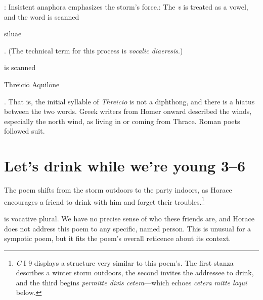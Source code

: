 
: Insistent anaphora emphasizes the storm's force.\indent{}: The \textit{v} is treated as a vowel, and the word is scanned \begin{metrica}s\-il\-u\=ae\end{metrica}.  (The technical term for this process is \textit{vocalic diaeresis}.)


 is scanned \begin{metrica}Thr\=e\-ic\-i\=o \-Aqu\-il\=on\-e\end{metrica}.  That is, the initial syllable of \textit{Threicio} is not a diphthong, and there is a hiatus between the two words.  Greek writers from Homer onward described the winds, especially the north wind, as living in or coming from Thrace.  Roman poets followed suit.


\section*{Let's drink while we're young 3--6}

The poem shifts from the storm outdoors to the party indoors, as Horace encourages a friend to drink with him and forget their troubles.\footnote{\textit{C} I 9 displays a structure very similar to this poem's.  The first stanza describes a winter storm outdoors, the second invites the addressee to drink, and the third begins \textit{permitte divis cetera}---which echoes \textit{cetera mitte loqui} below.}


 is vocative plural.  We have no precise sense of who these friends are, and Horace does not address this poem to any specific, named person.  This is unusual for a sympotic poem, but it fits the poem's overall reticence about its context.


